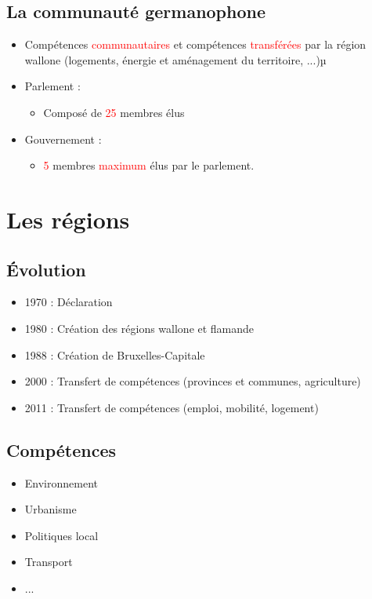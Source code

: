 \subsection{La communauté germanophone}
\begin{itemize}
	\item Compétences \textcolor{red}{communautaires} et compétences \textcolor{red}{transférées} par la région wallone (logements, énergie et aménagement du territoire, ...)µ
	\item Parlement :
	\begin{itemize}
		\item Composé de \textcolor{red}{25} membres élus
	\end{itemize}
	\item Gouvernement :
	\begin{itemize}
		\item \textcolor{red}{5} membres \textcolor{red}{maximum} élus par le parlement.
	\end{itemize}
\end{itemize}

\section{Les régions}

\subsection{Évolution}
\begin{itemize}
	\item 1970 : Déclaration
	\item 1980 : Création des régions wallone et flamande
	\item 1988 : Création de Bruxelles-Capitale
	\item 2000 : Transfert de compétences (provinces et communes, agriculture)
	\item 2011 : Transfert de compétences (emploi, mobilité, logement)
\end{itemize}

\subsection{Compétences}
\begin{itemize}
	\item Environnement
	\item Urbanisme
	\item Politiques local
	\item Transport
	\item ...
\end{itemize}

